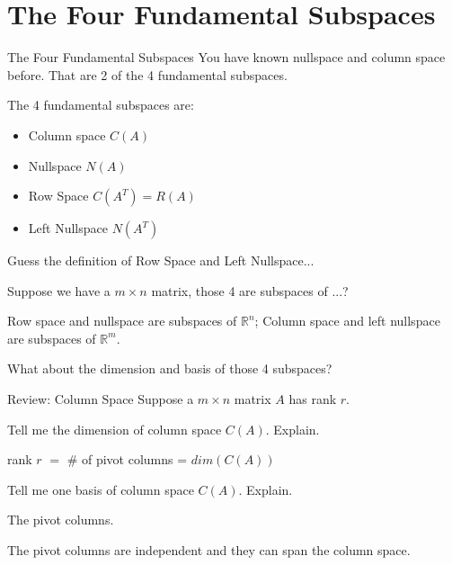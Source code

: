\documentclass{beamer}
\begin{document}
\section{The Four Fundamental Subspaces}
\begin{frame}{The Four Fundamental Subspaces}
You have known nullspace and column space before. That are 2 of the 4 fundamental subspaces.

\vspace{3pt}
The 4 fundamental subspaces are:
\begin{itemize}
    \item Column space $C(A)$
    \item Nullspace $N(A)$
    \item Row Space $C(A^T)=R(A)$
    \item Left Nullspace  $N(A^T)$
\end{itemize}

Guess the definition of Row Space and Left Nullspace...

\vspace{3pt}
Suppose we have a $m \times n$ matrix, those 4 are subspaces of ...?

\vspace{3pt}
Row space and nullspace are subspaces of $\mathbb{R}^n$; Column space and left nullspace are subspaces of $\mathbb{R}^m$.

\vspace{3pt}
What about the dimension and basis of those 4 subspaces?
\end{frame}

\begin{frame}{Review: Column Space}
Suppose a $m \times n$ matrix $A$ has rank $r$.

\vspace{3pt}
Tell me the dimension of column space $C(A)$. Explain.

\begin{center}
    rank $r$ $=$ \# of pivot columns = $dim(C(A))$
\end{center}

Tell me one basis of column space $C(A)$. Explain.

\begin{center}
    The pivot columns.
\end{center}

The pivot columns are independent and they can span the column space.
\end{frame}
\end{document}
